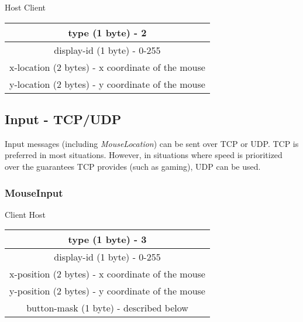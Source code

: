 \documentclass[11pt o]{article}
\begin{document}
    \begin{center}
        Host \textrightarrow Client\\
        \begin{tabular}{|c|}
            \hline
            type (1 byte) - 2                                \\
            \hline
            display-id (1 byte) - 0-255                      \\
            \hline
            x-location (2 bytes) - x coordinate of the mouse \\
            \hline
            y-location (2 bytes) - y coordinate of the mouse \\
            \hline
        \end{tabular}
    \end{center}

    \subsection{Input - TCP/UDP}

    Input messages (including \emph{MouseLocation}) can be sent over TCP or UDP. TCP is preferred in most situations. However, in situations where speed is prioritized over the guarantees TCP provides (such as gaming), UDP can be used.

    \subsubsection{MouseInput}

    \begin{center}
        Client \textrightarrow Host\\
        \begin{tabular}{|c|}
            \hline
            type (1 byte) - 3                                \\
            \hline
            display-id (1 byte) - 0-255                      \\
            \hline
            x-position (2 bytes) - x coordinate of the mouse \\
            \hline
            y-position (2 bytes) - y coordinate of the mouse \\
            \hline
            button-mask (1 byte) - described below           \\
            \hline
        \end{tabular}
    \end{center}
\end{document}

